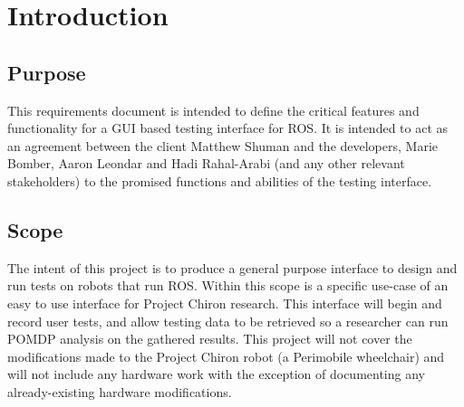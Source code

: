 \documentclass[onecolumn, draftclsnofoot,10pt, compsoc]{report}
\begin{document}
	\section{Introduction}
	\subsection{Purpose}
	This requirements document is intended to define the critical features and functionality for a GUI based testing interface for ROS. It is intended to act as an agreement between the client Matthew Shuman and the developers, Marie Bomber, Aaron Leondar and Hadi Rahal-Arabi (and any other relevant stakeholders) to the promised functions and abilities of the testing interface. 
	\subsection{Scope}
	The intent of this project is to produce a general purpose interface to design and run tests on robots that run ROS. Within this scope is a specific use-case of an easy to use interface for Project Chiron research. This interface will  begin and record user tests, and allow testing data to be retrieved so a researcher can run POMDP analysis on the gathered results. This project will not cover the modifications made to the Project Chiron robot (a Perimobile wheelchair) and will not include any hardware work with the exception of documenting any already-existing hardware modifications. 
	
\end{document}
